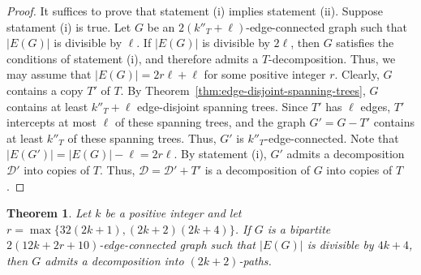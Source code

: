 \documentclass[12pt,reqno,a4paper]{amsart}
\newtheorem{theorem}{Theorem}[section]
\newcommand{\D}{\mathcal{D}}
\begin{document}
\begin{proof}
	It suffices to prove that statement (i) implies statement (ii).
	Suppose statament (i) is true.
	Let \(G\) be an \(2(k''_T + \ell)\)-edge-connected graph such 
	that \(|E(G)|\) is divisible by \(\ell\).
	If \(|E(G)|\) is divisible by \(2\ell\),
	then \(G\) satisfies the conditions of statement (i),
	and therefore admits a \(T\)-decomposition.
	Thus, we may assume that \(|E(G)| = 2r\ell + \ell\) for some positive 
integer \(r\).
	Clearly, \(G\) contains a copy \(T'\) of \(T\).
	By Theorem~\ref{thm:edge-disjoint-spanning-trees}, \(G\) contains at 
least
	\(k''_T + \ell\) edge-disjoint spanning trees.
	Since \(T'\) has \(\ell\) edges, \(T'\) intercepts at most \(\ell\) of 
	these spanning trees,
	and the graph \(G' = G - T'\) contains at least \(k''_T\) of 
these spanning trees.
	Thus, \(G'\) is \(k''_T\)-edge-connected.
	Note that \(|E(G')| = |E(G)| - \ell= 2r\ell\).
	By statement (i), \(G'\) admits a decomposition \(\D'\) into copies of 
\(T\).
	Thus, \(\D = \D' + T'\) is a decomposition of \(G\) into copies of 
\(T\).
\end{proof}





\begin{theorem}\label{thm:high-even}
	Let \(k\) be a positive integer and let \(r = 
\max\{32(2k+1),(2k+2)(2k+4)\}\). If \(G\) is a bipartite 
\(2(12k + 2r + 10)\)-edge-connected graph such that \(|E(G)|\) is divisible by 
\(4k+4\),
	then \(G\) admits a decomposition into \((2k+2)\)-paths.
\end{theorem}

\end{document}
